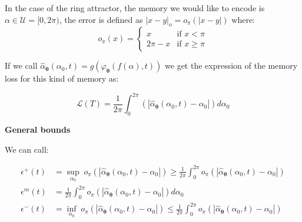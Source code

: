 \documentclass{article} %
\newcounter{ct}
\theoremstyle{definition}
\theoremstyle{remark}
\begin{document}
In the case of the ring attractor, the memory we would like to encode is \(\alpha \in \mathcal{U} = [0,2 \pi)\), the error is defined as \(|x-y|_o = o_\pi(|x-y|)\) where: %
\begin{equation}
    o_\pi(x) = \begin{cases}
    x & \text{if } x < \pi \\
    2 \pi - x & \text{if } x \geq \pi
    \end{cases}
\end{equation}

If we call \(\hat{\alpha}_{\boldsymbol{\theta}}(\alpha_0, t) = g(\varphi_{\bm{\theta}}(f(\alpha),t))\) we get the expression of the memory loss for this kind of memory as:

\begin{equation}
    \mathcal{L}(T) =  \frac{1}{2 \pi} \int_0^{2 \pi}    \left( \left| \hat{\alpha}_{\boldsymbol{\theta}}(\alpha_0, t) - \alpha_0  \right| \right)  d\alpha_0
\end{equation}


%







\textbf{General bounds}

We can call:

\begin{equation}
\begin{split}
    \epsilon^+(t) &= \sup_{\alpha_0} \; o_\pi \left( \left| \hat{\alpha}_{\boldsymbol{\theta}}(\alpha_0, t) - \alpha_0  \right| \right) \geq \frac{1}{2 \pi} \int_0^{2 \pi}  o_\pi \left( \left| \hat{\alpha}_{\boldsymbol{\theta}}(\alpha_0, t) - \alpha_0  \right| \right)  \\
     \epsilon^{m}(t) &= \frac{1}{2 \pi} \int_0^{2 \pi}  o_\pi \left( \left| \hat{\alpha}_{\boldsymbol{\theta}}(\alpha_0, t) - \alpha_0  \right| \right) d\alpha_0 \\
    \epsilon^-(t) &= \inf_{\alpha_0} \; o_\pi \left( \left| \hat{\alpha}_{\boldsymbol{\theta}}(\alpha_0, t) - \alpha_0  \right| \right) \leq \frac{1}{2 \pi} \int_0^{2 \pi}  o_\pi \left( \left| \hat{\alpha}_{\boldsymbol{\theta}}(\alpha_0, t) - \alpha_0  \right| \right)
\end{split}
\end{equation}
\end{document}
